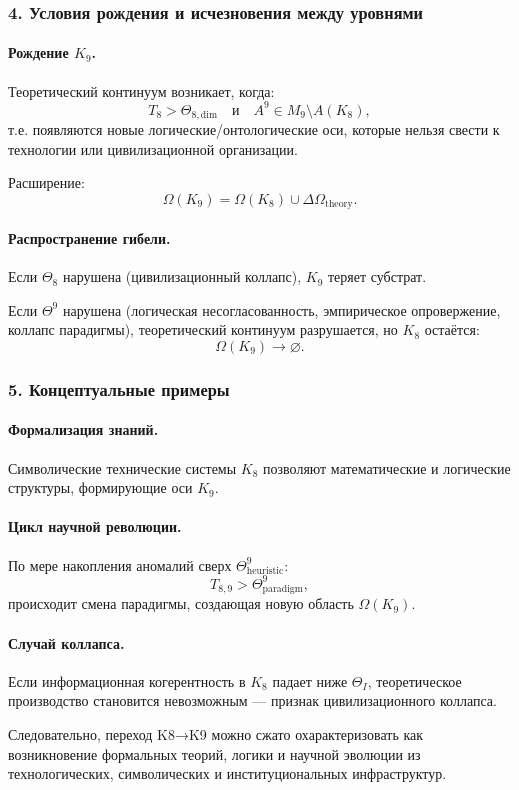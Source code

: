 \subsubsection{4. Условия рождения и исчезновения между уровнями}

\paragraph{Рождение \texorpdfstring{$K_9$}{K_9}.}
Теоретический континуум возникает, когда:
\[
T_8 > \Theta_{8,\mathrm{dim}}
\quad\text{и}\quad
A^9 \in M_9 \setminus A(K_8),
\]
т.е. появляются новые логические/онтологические оси, которые нельзя свести к
технологии или цивилизационной организации.

Расширение:
\[
\Omega(K_9) = \Omega(K_8) \cup \Delta\Omega_{\mathrm{theory}}.
\]

\paragraph{Распространение гибели.}
Если $\Theta_8$ нарушена (цивилизационный коллапс), $K_9$ теряет субстрат.

Если $\Theta^9$ нарушена (логическая несогласованность, эмпирическое
опровержение, коллапс парадигмы), теоретический континуум разрушается, но
$K_8$ остаётся:
\[
\Omega(K_9) \rightarrow \varnothing.
\]

\subsubsection{5. Концептуальные примеры}

\paragraph{Формализация знаний.}
Символические технические системы $K_8$ позволяют математические и логические
структуры, формирующие оси $K_9$.

\paragraph{Цикл научной революции.}
По мере накопления аномалий сверх $\Theta^9_{\mathrm{heuristic}}$:
\[
T_{8,9} > \Theta^9_{\mathrm{paradigm}},
\]
происходит смена парадигмы, создающая новую область $\Omega(K_9)$.

\paragraph{Случай коллапса.}
Если информационная когерентность в $K_8$ падает ниже $\Theta_I$, теоретическое
производство становится невозможным — признак цивилизационного коллапса.

Следовательно, переход K8→K9 можно сжато охарактеризовать как возникновение
формальных теорий, логики и научной эволюции из технологических,
символических и институциональных инфраструктур.

